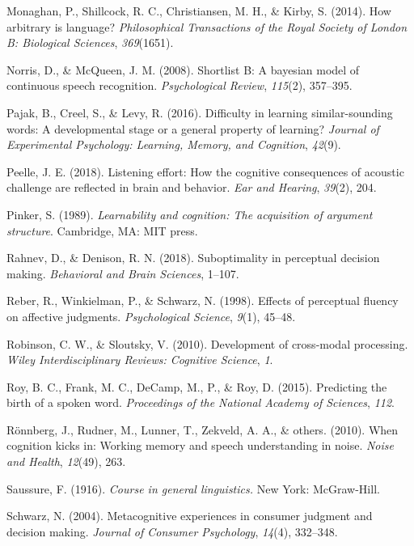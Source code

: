 \documentclass[english,,man,floatsintext]{apa6}
\theoremstyle{definition}
\theoremstyle{definition}
\theoremstyle{definition}
\theoremstyle{remark}
\begin{document}
\hypertarget{ref-Monaghan2014}{}
Monaghan, P., Shillcock, R. C., Christiansen, M. H., \& Kirby, S.
(2014). How arbitrary is language? \emph{Philosophical Transactions of
the Royal Society of London B: Biological Sciences}, \emph{369}(1651).

\hypertarget{ref-Norris08}{}
Norris, D., \& McQueen, J. M. (2008). Shortlist B: A bayesian model of
continuous speech recognition. \emph{Psychological Review},
\emph{115}(2), 357--395.

\hypertarget{ref-pajak2016}{}
Pajak, B., Creel, S., \& Levy, R. (2016). Difficulty in learning
similar-sounding words: A developmental stage or a general property of
learning? \emph{Journal of Experimental Psychology: Learning, Memory,
and Cognition}, \emph{42}(9).

\hypertarget{ref-peelle2018}{}
Peelle, J. E. (2018). Listening effort: How the cognitive consequences
of acoustic challenge are reflected in brain and behavior. \emph{Ear and
Hearing}, \emph{39}(2), 204.

\hypertarget{ref-pinker1989}{}
Pinker, S. (1989). \emph{Learnability and cognition: The acquisition of
argument structure}. Cambridge, MA: MIT press.

\hypertarget{ref-rahnev2018}{}
Rahnev, D., \& Denison, R. N. (2018). Suboptimality in perceptual
decision making. \emph{Behavioral and Brain Sciences}, 1--107.

\hypertarget{ref-reber98}{}
Reber, R., Winkielman, P., \& Schwarz, N. (1998). Effects of perceptual
fluency on affective judgments. \emph{Psychological Science},
\emph{9}(1), 45--48.

\hypertarget{ref-robinson2010}{}
Robinson, C. W., \& Sloutsky, V. (2010). Development of cross-modal
processing. \emph{Wiley Interdisciplinary Reviews: Cognitive Science},
\emph{1}.

\hypertarget{ref-roy2015}{}
Roy, B. C., Frank, M. C., DeCamp, M., P., \& Roy, D. (2015). Predicting
the birth of a spoken word. \emph{Proceedings of the National Academy of
Sciences}, \emph{112}.

\hypertarget{ref-ronnberg2010}{}
Rönnberg, J., Rudner, M., Lunner, T., Zekveld, A. A., \& others. (2010).
When cognition kicks in: Working memory and speech understanding in
noise. \emph{Noise and Health}, \emph{12}(49), 263.

\hypertarget{ref-saussure1916}{}
Saussure, F. (1916). \emph{Course in general linguistics.} New York:
McGraw-Hill.

\hypertarget{ref-schwarz2004}{}
Schwarz, N. (2004). Metacognitive experiences in consumer judgment and
decision making. \emph{Journal of Consumer Psychology}, \emph{14}(4),
332--348.
\end{document}
